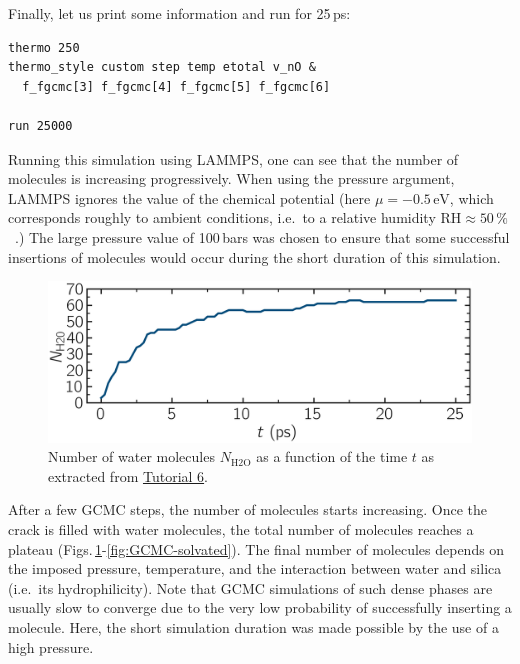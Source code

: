 \documentclass[9pt,tutorial]{livecoms}
\begin{document}
Finally, let us print some information and run for 25\,ps:
\begin{lstlisting}
thermo 250
thermo_style custom step temp etotal v_nO &
  f_fgcmc[3] f_fgcmc[4] f_fgcmc[5] f_fgcmc[6]

run 25000
\end{lstlisting}
Running this simulation using LAMMPS, one can see that the number of molecules is increasing
progressively.  When using the pressure argument, LAMMPS ignores the value of the
chemical potential (here $\mu = -0.5\,\text{eV}$, which corresponds roughly to
ambient conditions, i.e.~to a relative humidity $\text{RH} \approx 50\,\%$~\cite{gravelle2020multi}.)
The large pressure value of 100\,bars was chosen to ensure that some successful
insertions of molecules would occur during the short duration of this simulation.

\begin{figure}
\centering
\includegraphics[width=\linewidth]{GCMC-number}
\caption{Number of water molecules $N_\text{H2O}$ as a function of the time $t$
as extracted from \hyperref[gcmc-silica-label]{Tutorial 6}.}
\label{fig:GCMC-number}
\end{figure}

After a few GCMC steps, the number of molecules starts increasing.  Once the
crack is filled with water molecules, the total number of molecules reaches a plateau
(Figs.\,\ref{fig:GCMC-number}-\ref{fig:GCMC-solvated}).  The final number of
molecules depends on the imposed pressure, temperature, and the interaction
between water and silica (i.e.~its hydrophilicity).  Note that GCMC simulations
of such dense phases are usually slow to converge due to the very low probability
of successfully inserting a molecule.  Here, the short simulation duration was
made possible by the use of a high pressure.
\end{document}
